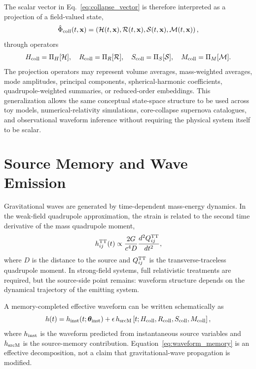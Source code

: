 \documentclass[11pt]{article}
\begin{document}
The scalar vector in Eq.~\eqref{eq:collapse_vector} is therefore interpreted as a projection of a field-valued state,
\begin{equation}
\hat{\Phi}_{\rm coll}(t,\mathbf{x})=\left(\mathcal{H}(t,\mathbf{x}),\mathcal{R}(t,\mathbf{x}),\mathcal{S}(t,\mathbf{x}),\mathcal{M}(t,\mathbf{x})\right),
\end{equation}
through operators
\begin{equation}
H_{\rm coll}=\Pi_H[\mathcal{H}],\quad R_{\rm coll}=\Pi_R[\mathcal{R}],\quad S_{\rm coll}=\Pi_S[\mathcal{S}],\quad M_{\rm coll}=\Pi_M[\mathcal{M}].
\end{equation}
The projection operators may represent volume averages, mass-weighted averages, mode amplitudes, principal components, spherical-harmonic coefficients, quadrupole-weighted summaries, or reduced-order embeddings. This generalization allows the same conceptual state-space structure to be used across toy models, numerical-relativity simulations, core-collapse supernova catalogues, and observational waveform inference without requiring the physical system itself to be scalar.

\section{Source Memory and Wave Emission}
\label{sec:wave_coupling}

Gravitational waves are generated by time-dependent mass-energy dynamics. In the weak-field quadrupole approximation, the strain is related to the second time derivative of the mass quadrupole moment,
\begin{equation}
h_{ij}^{\rm TT}(t)\propto \frac{2G}{c^4D}\frac{d^2 Q_{ij}^{\rm TT}}{dt^2},
\end{equation}
where \(D\) is the distance to the source and \(Q_{ij}^{\rm TT}\) is the transverse-traceless quadrupole moment. In strong-field systems, full relativistic treatments are required, but the source-side point remains: waveform structure depends on the dynamical trajectory of the emitting system.

A memory-completed effective waveform can be written schematically as
\begin{equation}
h(t)=h_{\rm inst}(t;\bm{\theta}_{\rm inst})+\epsilon\,h_{\rm srcM}\left[t;H_{\rm coll},R_{\rm coll},S_{\rm coll},M_{\rm coll}\right],
\label{eq:waveform_memory}
\end{equation}
where \(h_{\rm inst}\) is the waveform predicted from instantaneous source variables and \(h_{\rm srcM}\) is the source-memory contribution. Equation~\eqref{eq:waveform_memory} is an effective decomposition, not a claim that gravitational-wave propagation is modified.
\end{document}
